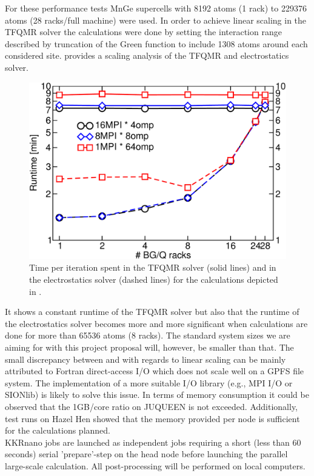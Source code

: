 \documentclass [a4paper, 12pt]{article}
\begin{document}
For these performance tests MnGe supercells
with 8192 atoms (1 rack) to 229376 atoms (28 racks/full machine) were used.
In order to achieve linear scaling in the TFQMR solver the calculations were 
done by setting the interaction range described by truncation of the Green function to include 
1308 atoms around each considered site.
 provides a scaling analysis of the TFQMR and electrostatics solver.
\begin{figure}[h]
\begin{center}
 \includegraphics[scale=0.45]{Figures/combinedtfqmrelectrostatics.pdf}
\end{center}
\caption{Time per iteration spent in the TFQMR solver (solid lines) 
	and in the electrostatics solver (dashed lines) for the calculations depicted in
	.}
\label{fig:tfqmr_es_times}
\end{figure}
It shows 
a constant runtime of the TFQMR solver but also that the runtime of the electrostatics solver becomes
more and more significant when calculations are done for more than 65536 atoms (8 racks). 
The standard system sizes we are aiming
for with this project proposal will, however, be smaller than that.
The small discrepancy between  and  with regards to linear
scaling can be mainly attributed to Fortran direct-access I/O which does not scale well on a GPFS file system.
The implementation of a more suitable I/O library (e.g., MPI I/O or SIONlib) is likely to solve this issue.
In terms of memory consumption it could be observed that the 1GB/core ratio on JUQUEEN is not exceeded.
Additionally, test runs on Hazel Hen showed that the memory provided per node is sufficient for the calculations
planned.
\\
KKRnano jobs are launched as independent jobs requiring a short (less than 60 seconds) serial 'prepare'-step on
the head node
before launching the parallel large-scale calculation. All post-processing will be
performed on local computers.
\end{document}
